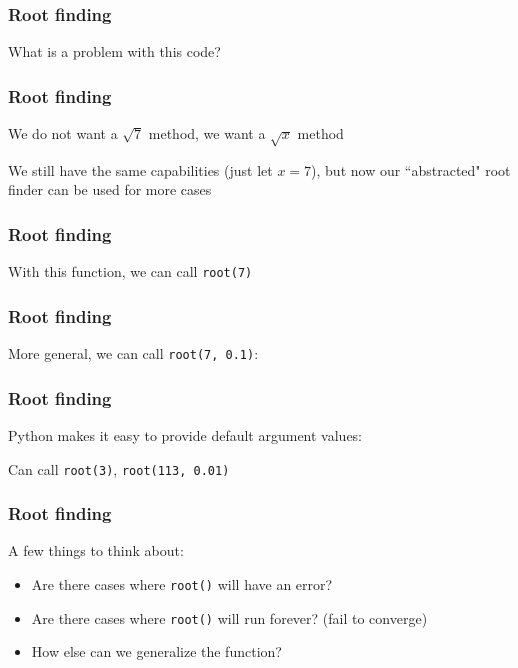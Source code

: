 \documentclass{beamer}
\begin{document}
\begin{frame}
\frametitle{Root finding}

What is a problem with this code?



\end{frame}

\begin{frame}
\frametitle{Root finding}
We do not want a $\sqrt{7}$ method, we want a $\sqrt{x}$ method

\vspace{0.2in}

We still have the same capabilities (just let $x = 7$), but now our ``abstracted" root finder can be used for more cases
\end{frame}


\begin{frame}
\frametitle{Root finding}

With this function, we can call \texttt{root(7)}



\end{frame}

\begin{frame}
\frametitle{Root finding}
More general, we can call \texttt{root(7, 0.1)}:



\end{frame}


\begin{frame}
\frametitle{Root finding}
Python makes it easy to provide default argument values:



Can call \texttt{root(3)}, \texttt{root(113, 0.01)}
\end{frame}

\begin{frame}
\frametitle{Root finding}
A few things to think about:
\vspace{0.1in}
\begin{itemize}
\setlength{\itemsep}{0.1in}
\item{Are there cases where \texttt{root()} will have an error?}
\item{Are there cases where \texttt{root()} will run forever? (fail to converge)}
\item{How else can we generalize the function?}
\end{itemize}
\end{frame}
\end{document}
